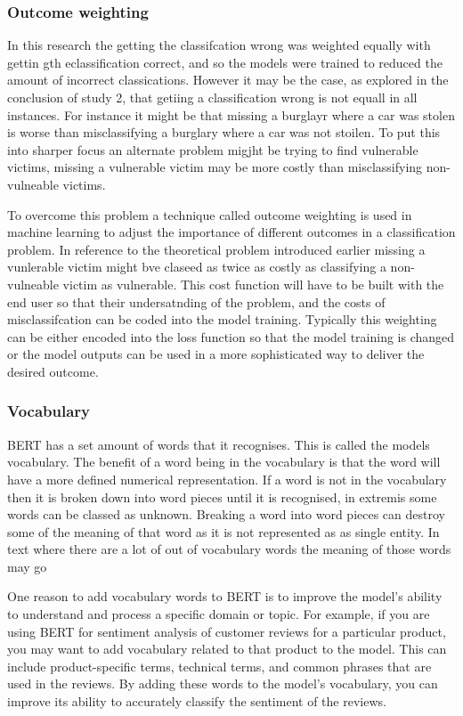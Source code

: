 \subsubsection{Outcome weighting} In this research the getting the classifcation wrong was weighted equally with gettin gth eclassification correct, and so the models were trained to reduced the amount of incorrect classications. However it may be the case, as explored in the conclusion of study 2, that getiing a classification wrong is not equall in all instances. For instance it might be that missing a burglayr where a car was stolen is worse than misclassifying a burglary where a car was not stoilen. To put this into sharper focus an alternate problem migjht be trying to find vulnerable victims, missing a vulnerable victim may be more costly than misclassifying non-vulneable victims. 

To overcome this problem a technique called outcome weighting is used in machine learning to adjust the importance of different outcomes in a classification problem. In reference to the theoretical problem introduced earlier missing a vunlerable victim might bve claseed as twice as costly as classifying a non-vulneable victim as vulnerable. This cost function will have to be built with the end user so that their undersatnding of the problem, and the costs of misclassifcation can be coded into the model training. Typically this weighting can be either encoded into the loss function so that the model training is changed or the model outputs can be used in a more sophisticated way to deliver the desired outcome.  


\subsubsection{Vocabulary} BERT has a set amount of words that it recognises. This is called the models vocabulary. The benefit of a word being in the vocabulary is that the word will have a more defined numerical representation. If a word is not in the vocabulary then it is broken down into word pieces until it is recognised, in extremis some words can be classed as unknown. Breaking a word into word pieces can destroy some of the meaning of that word as it is not represented as as single entity. In text where there are a lot of out of vocabulary words the meaning of those words may go 


One reason to add vocabulary words to BERT is to improve the model's ability to understand and process a specific domain or topic. For example, if you are using BERT for sentiment analysis of customer reviews for a particular product, you may want to add vocabulary related to that product to the model. This can include product-specific terms, technical terms, and common phrases that are used in the reviews. By adding these words to the model's vocabulary, you can improve its ability to accurately classify the sentiment of the reviews.

